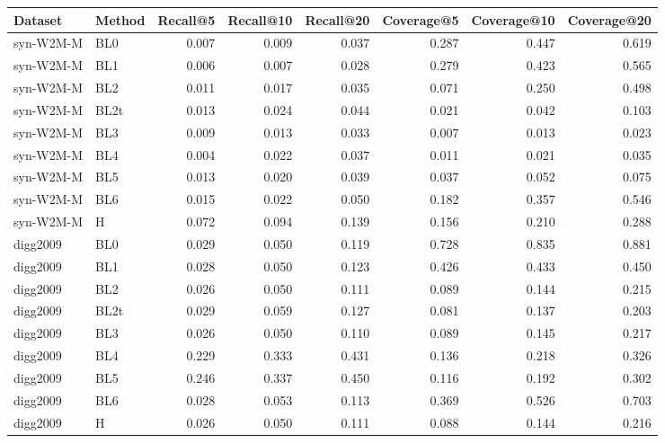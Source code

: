 \begin{tabular}{llrrrrrr}
\toprule
Dataset & Method & Recall@5 & Recall@10 & Recall@20 & Coverage@5 & Coverage@10 & Coverage@20 \\
\midrule
syn-W2M-M & BL0 & 0.007 & 0.009 & 0.037 & 0.287 & 0.447 & 0.619 \\
syn-W2M-M & BL1 & 0.006 & 0.007 & 0.028 & 0.279 & 0.423 & 0.565 \\
syn-W2M-M & BL2 & 0.011 & 0.017 & 0.035 & 0.071 & 0.250 & 0.498 \\
syn-W2M-M & BL2t & 0.013 & 0.024 & 0.044 & 0.021 & 0.042 & 0.103 \\
syn-W2M-M & BL3 & 0.009 & 0.013 & 0.033 & 0.007 & 0.013 & 0.023 \\
syn-W2M-M & BL4 & 0.004 & 0.022 & 0.037 & 0.011 & 0.021 & 0.035 \\
syn-W2M-M & BL5 & 0.013 & 0.020 & 0.039 & 0.037 & 0.052 & 0.075 \\
syn-W2M-M & BL6 & 0.015 & 0.022 & 0.050 & 0.182 & 0.357 & 0.546 \\
syn-W2M-M & H & 0.072 & 0.094 & 0.139 & 0.156 & 0.210 & 0.288 \\
digg2009 & BL0 & 0.029 & 0.050 & 0.119 & 0.728 & 0.835 & 0.881 \\
digg2009 & BL1 & 0.028 & 0.050 & 0.123 & 0.426 & 0.433 & 0.450 \\
digg2009 & BL2 & 0.026 & 0.050 & 0.111 & 0.089 & 0.144 & 0.215 \\
digg2009 & BL2t & 0.029 & 0.059 & 0.127 & 0.081 & 0.137 & 0.203 \\
digg2009 & BL3 & 0.026 & 0.050 & 0.110 & 0.089 & 0.145 & 0.217 \\
digg2009 & BL4 & 0.229 & 0.333 & 0.431 & 0.136 & 0.218 & 0.326 \\
digg2009 & BL5 & 0.246 & 0.337 & 0.450 & 0.116 & 0.192 & 0.302 \\
digg2009 & BL6 & 0.028 & 0.053 & 0.113 & 0.369 & 0.526 & 0.703 \\
digg2009 & H & 0.026 & 0.050 & 0.111 & 0.088 & 0.144 & 0.216 \\
\bottomrule
\end{tabular}
